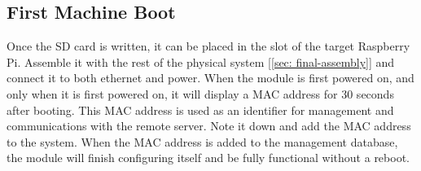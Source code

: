 \subsection{First Machine Boot}
    Once the SD card is written,
        it can be placed in the slot of the target Raspberry Pi.
    Assemble it with the rest of the physical system [\cref{sec: final-assembly}] and connect it to both ethernet and power.
    When the module is first powered on,
        and only when it is first powered on,
    it will display a MAC address for 30 seconds after booting.
    This MAC address is used as an identifier for management and communications with the remote server.
    Note it down and add the MAC address to the system.
    When the MAC address is added to the management database,
        the module will finish configuring itself and be fully functional without a reboot.
